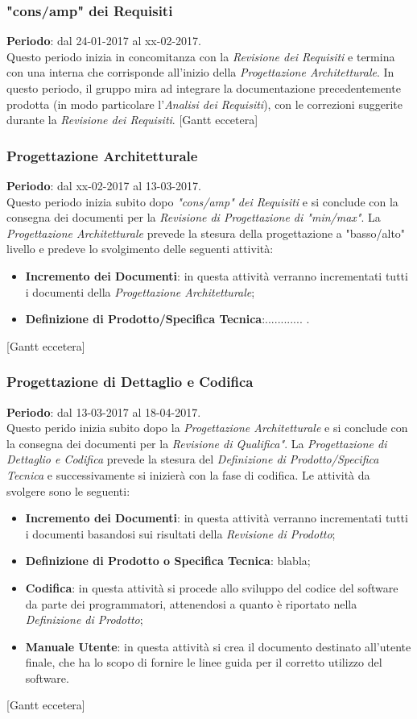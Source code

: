 	\subsubsection{"cons/amp" dei Requisiti}
	\textbf{Periodo}: dal 24-01-2017 al xx-02-2017.
	\\ Questo periodo inizia in concomitanza con la \textit{Revisione dei Requisiti} e termina con una  interna che corrisponde all'inizio
	della \textit{Progettazione Architetturale}. In questo periodo, il gruppo mira ad integrare la documentazione precedentemente prodotta (in modo particolare
	l'\textit{Analisi dei Requisiti}), con le correzioni suggerite durante la \textit{Revisione dei Requisiti}.
	[Gantt eccetera]
	\subsubsection{Progettazione Architetturale}
	\textbf{Periodo}: dal xx-02-2017 al 13-03-2017.	
	\\ Questo periodo inizia subito dopo \textit{"cons/amp" dei Requisiti} e si conclude con la consegna dei documenti per la 
	\textit{Revisione di Progettazione di "min/max"}.
	La \textit{Progettazione Architetturale} prevede la stesura della progettazione a "basso/alto" livello e predeve lo svolgimento delle seguenti attività:
	\begin{itemize}
		\item \textbf{Incremento dei Documenti}: in questa attività verranno incrementati tutti i documenti della \textit{Progettazione Architetturale};
		\item \textbf{Definizione di Prodotto/Specifica Tecnica}:............   .
	\end{itemize}
	[Gantt eccetera]
	\subsubsection{Progettazione di Dettaglio e Codifica}
	\textbf{Periodo}: dal 13-03-2017 al 18-04-2017.	
	\\ Questo perido inizia subito dopo la \textit{Progettazione Architetturale} e si conclude con la consegna dei documenti per la \textit{Revisione di Qualifica"}.
	La \textit{Progettazione di Dettaglio e Codifica} prevede la stesura del \textit{Definizione di Prodotto/Specifica Tecnica} e successivamente si inizierà
	con la fase di codifica.
	Le attività da svolgere sono le seguenti:
	\begin{itemize}
		\item \textbf{Incremento dei Documenti}: in questa attività verranno incrementati tutti i documenti basandosi sui risultati della \textit{Revisione di Prodotto}; 
		\item \textbf{Deﬁnizione di Prodotto o Specifica Tecnica}: blabla;
		\item \textbf{Codiﬁca}: in questa attività si procede allo sviluppo del codice del software da parte dei programmatori, attenendosi a quanto è riportato nella \textit{Deﬁnizione di Prodotto}; 
		\item \textbf{Manuale Utente}: in questa attività si crea il documento destinato all'utente finale, che ha lo scopo di fornire le linee guida per il corretto utilizzo del software.
	\end{itemize}
	[Gantt eccetera]
